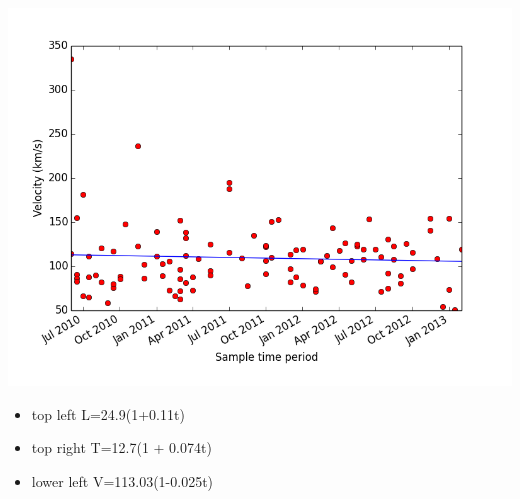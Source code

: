 \documentclass{beamer}
\begin{document}
\begin{frame}
		\begin{minipage}{0.49\textwidth}
			\begin{flushright}
			\includegraphics[width=1\textwidth]{Figs/velocity_vs_solarcycle.png}
			\end{flushright}
		\end{minipage}
		\begin{minipage}{0.49\textwidth}
			\begin{itemize}
				\small
				\item{top left L=24.9(1+0.11t)}
				\item{top right T=12.7(1 + 0.074t)}
				\item{lower left V=113.03(1-0.025t)}
			\end{itemize}
		\end{minipage}
	\end{frame}
\end{document}
